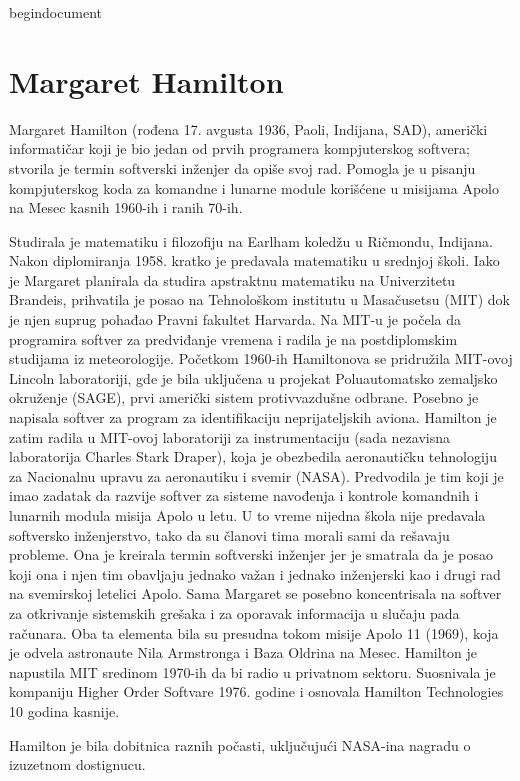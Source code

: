 \documentclass[a4paper,12pt]{article}
\begin{document}
begin{document}

\section{Margaret Hamilton}

\begin{flushleft}
 Margaret Hamilton (rođena 17. avgusta 1936, Paoli, Indijana, SAD), američki informatičar koji je bio jedan od prvih programera kompjuterskog softvera; stvorila je termin softverski inženjer da opiše svoj rad. Pomogla je u pisanju kompjuterskog koda za komandne i lunarne module korišćene u misijama Apolo na Mesec kasnih 1960-ih i ranih 70-ih.

    Studirala je matematiku i filozofiju na Earlham koledžu u Ričmondu, Indijana. Nakon diplomiranja 1958. kratko je predavala matematiku u srednjoj školi. Iako je Margaret planirala da studira apstraktnu matematiku na Univerzitetu Brandeis, prihvatila je posao na Tehnološkom institutu u Masačusetsu (MIT) dok je njen suprug pohađao Pravni fakultet Harvarda. Na MIT-u je počela da programira softver za predviđanje vremena i radila je na postdiplomskim studijama iz meteorologije.
    Početkom 1960-ih Hamiltonova se pridružila MIT-ovoj Lincoln laboratoriji, gde je bila uključena u projekat Poluautomatsko zemaljsko okruženje (SAGE), prvi američki sistem protivvazdušne odbrane. Posebno je napisala softver za program za identifikaciju neprijateljskih aviona. Hamilton je zatim radila u MIT-ovoj laboratoriji za instrumentaciju (sada nezavisna laboratorija Charles Stark Draper), koja je obezbedila aeronautičku tehnologiju za Nacionalnu upravu za aeronautiku i svemir (NASA). Predvodila je tim koji je imao zadatak da razvije softver za sisteme navođenja i kontrole komandnih i lunarnih modula misija Apolo u letu. U to vreme nijedna škola nije predavala softversko inženjerstvo, tako da su članovi tima morali sami da rešavaju probleme. Ona je kreirala termin softverski inženjer jer je smatrala da je posao koji ona i njen tim obavljaju jednako važan i jednako inženjerski kao i drugi rad na svemirskoj letelici Apolo. Sama Margaret se posebno koncentrisala na softver za otkrivanje sistemskih grešaka i za oporavak informacija u slučaju pada računara. Oba ta elementa bila su presudna tokom misije Apolo 11 (1969), koja je odvela astronaute Nila Armstronga i Baza Oldrina na Mesec. Hamilton je napustila MIT sredinom 1970-ih da bi radio u privatnom sektoru. Suosnivala je kompaniju Higher Order Softvare 1976. godine i osnovala Hamilton Technologies 10 godina kasnije.

    Hamilton je bila dobitnica raznih počasti, uključujući NASA-ina nagradu o izuzetnom dostignucu.
    
\end{flushleft}
\end{document}
